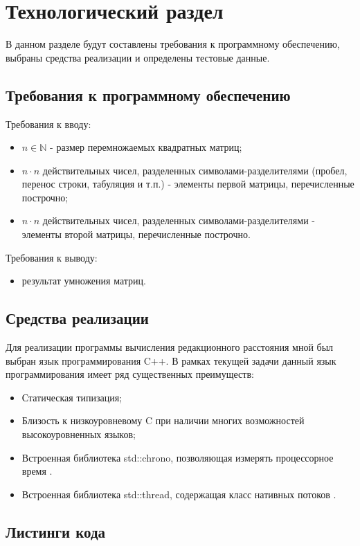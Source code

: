 \chapter{Технологический раздел}
\label{cha:impl}

В данном разделе будут составлены требования к программному обеспечению, выбраны средства реализации и определены тестовые данные.

\section{Требования к программному обеспечению}
Требования к вводу:
\begin{itemize}
    \item $n \in \mathbb{N}$ - размер перемножаемых квадратных матриц;
    \item $n \cdot{} n$ действительных чисел, разделенных символами-разделителями (пробел, перенос строки, табуляция и т.п.) - элементы первой матрицы, перечисленные построчно;
    \item $n \cdot{} n$ действительных чисел, разделенных символами-разделителями - элементы второй матрицы, перечисленные построчно.
\end{itemize}
Требования к выводу:
\begin{itemize}
    \item результат умножения матриц.
\end{itemize}

\section{Средства реализации}
Для реализации программы вычисления редакционного расстояния мной был выбран язык программирования C++. В рамках текущей задачи данный язык программирования имеет ряд существенных преимуществ:
\begin{itemize}
    \item Статическая типизация;
    \item Близость к низкоуровневому C при наличии многих возможностей высокоуровненных языков;
    \item Встроенная библиотека std::chrono, позволяющая измерять процессорное время \cite{chrono}.
    \item Встроенная библиотека std::thread, содержащая класс нативных потоков \cite{thread}.
\end{itemize}

\section{Листинги кода}


